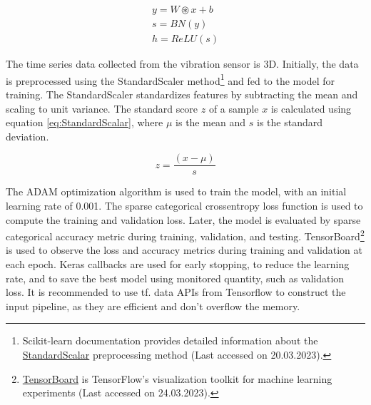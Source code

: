 \documentclass[
  manuscript=report,  %
  layout=preprint,  %
  year=20xx,
  volume=x,
]{extra/joas}
\begin{document}
\begin{equation} \label{eq:FCN}
\begin{aligned}
y = W \circledast x + b\\
s = BN(y)\\
h = ReLU(s)
\end{aligned}
\end{equation}



The time series data collected from the vibration sensor is 3D. Initially, the data is preprocessed using the StandardScaler method\footnote{Scikit-learn documentation provides detailed information about the \href{https://scikit-learn.org/stable/modules/generated/sklearn.preprocessing.StandardScaler.html}{StandardScalar} preprocessing method (Last accessed on 20.03.2023).} and fed to the model for training. The StandardScaler standardizes features by subtracting the mean and scaling to unit variance. The standard score $z$ of a sample $x$ is calculated using equation \ref{eq:StandardScalar}, where $\mu$ is the mean and $s$ is the standard deviation.

\begin{equation} \label{eq:StandardScalar}
z = \frac{(x - \mu)}{s}
\end{equation}

The ADAM\cite{kingma2017adam} optimization algorithm is used to train the model, with an initial learning rate of 0.001. The sparse categorical crossentropy loss function is used to compute the training and validation loss. Later, the model is evaluated by sparse categorical accuracy metric during training, validation, and testing. TensorBoard\footnote{\href{https://www.tensorflow.org/tensorboard}{TensorBoard} is TensorFlow's visualization toolkit for machine learning experiments (Last accessed on 24.03.2023).} is used to observe the loss and accuracy metrics during training and validation at each epoch. Keras callbacks are used for early stopping, to reduce the learning rate, and to save the best model using monitored quantity, such as validation loss. It is recommended to use tf. data APIs from Tensorflow to construct the input pipeline, as they are efficient and don't overflow the memory.
\end{document}
